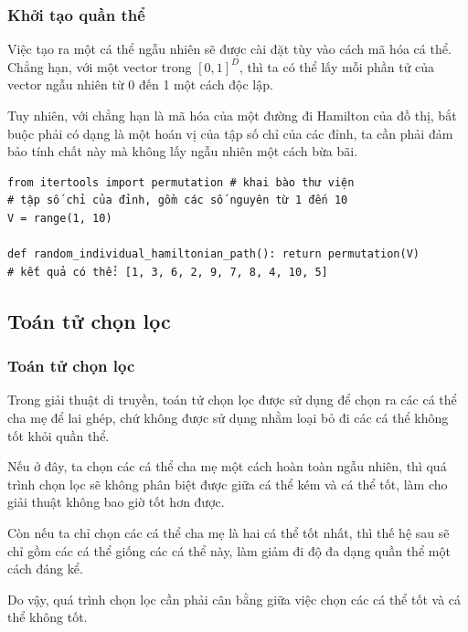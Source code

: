 \begin{frame}[fragile]
\frametitle{Khởi tạo quần thể}
Việc tạo ra một cá thể ngẫu nhiên sẽ được cài đặt tùy vào cách mã hóa cá thể.
Chẳng hạn, với một vector trong \( [0, 1]^{D} \), thì ta có thể lấy mỗi phần tử
của vector ngẫu nhiên từ 0 đến 1 một cách độc lập.

Tuy nhiên, với chẳng hạn là mã hóa của một đường đi Hamilton của đồ thị, bắt
buộc phải có dạng là một hoán vị của tập số chỉ của các đỉnh, ta cần phải đảm
bảo tính chất này mà không lấy ngẫu nhiên một cách bừa bãi.

\begin{verbatim}
from itertools import permutation # khai bào thư viện
# tập số chỉ của đỉnh, gồm các số nguyên từ 1 đến 10
V = range(1, 10)

def random_individual_hamiltonian_path(): return permutation(V)
# kết quả có thể: [1, 3, 6, 2, 9, 7, 8, 4, 10, 5]
\end{verbatim}
\end{frame}

\subsection{Toán tử chọn lọc} %
\label{sub:Toán tử chọn lọc}

\begin{frame}[fragile]
  \frametitle{Toán tử chọn lọc}
  Trong giải thuật di truyền, toán tử chọn lọc được sử dụng để chọn ra các cá
  thể cha mẹ để lai ghép, chứ không được sử dụng nhằm loại bỏ đi các cá thể
  không tốt khỏi quần thể.

  Nếu ở đây, ta chọn các cá thể cha mẹ một cách hoàn toàn ngẫu nhiên, thì quá
  trình chọn lọc sẽ không phân biệt được giữa cá thể kém và cá thể tốt, làm cho
  giải thuật không bao giờ tốt hơn được.

  Còn nếu ta chỉ chọn các cá thể cha mẹ là hai cá thể tốt nhất, thì thế hệ sau
  sẽ chỉ gồm các cá thể giống các cá thể này, làm giảm đi độ đa dạng quần thể
  một cách đáng kể.

  Do vậy, quá trình chọn lọc cần phải cân bằng giữa việc chọn các cá thể tốt và
  cá thể không tốt.
\end{frame}


